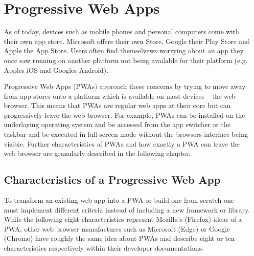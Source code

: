 \section{Progressive Web Apps}
\label{sec:theorieC}


As of today, devices such as mobile phones and personal computers come with their own app store. Microsoft offers their own Store, Google their Play Store and Apple the App Store. Users often find themselvews worrying about an app they once saw running on another platform not being available for their platform (e.g. Apples iOS and Googles Android). \cite[p. 3]{sheppardBeginningProgressiveWeb2017}

Progressive Web Apps (PWAs) approach these concerns by trying to move away from app stores onto a platform which is available on most devices – the web browser. This means that PWAs are regular web apps at their core but can progressively leave the web browser. For example, PWAs can be installed on the underlaying operating system and be accessed from the app switcher or the taskbar and be executed in full screen mode without the browsers interface being visible. \cite[p. 26]{liebelProgressiveWebApps2019} Further characteristics of PWAs and how exactly a PWA can leave the web browser are granularly described in the following chapter.


\subsection{Characteristics of a Progressive Web App}
\label{sec:theorieCa}


To transform an existing web app into a PWA or build one from scratch one must implement different criteria instead of including a new framework or library. \cite[p. 6]{sheppardBeginningProgressiveWeb2017}
While the following eight characteristics represent Mozilla’s (Firefox) ideas of a PWA, other web browser manufactures such as Microsoft (Edge) or Google (Chrome) have roughly the same idea about PWAs and describe eight or ten characteristics respectively within their developer documentations. \cite[p. 90]{liebelProgressiveWebApps2019}\cite{ProgressiveWebApps}

